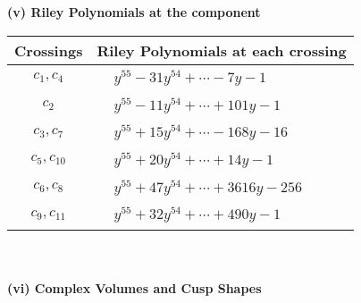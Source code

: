 \documentclass[1p]{elsarticle_modified}
\theoremstyle{definition}
\begin{document}
\newpage\renewcommand{\arraystretch}{1}
\flushleft \textbf{(v) Riley Polynomials at the component}\newline \\
\begin{tabular}{m{50pt}|m{274pt}}
Crossings & \hspace{64pt}Riley Polynomials at each crossing \\
\hline $$\begin{aligned}c_{1},c_{4}\end{aligned}$$&$\begin{aligned}
&y^{55}-31 y^{54}+\cdots-7 y-1
\end{aligned}$\\
\hline $$\begin{aligned}c_{2}\end{aligned}$$&$\begin{aligned}
&y^{55}-11 y^{54}+\cdots+101 y-1
\end{aligned}$\\
\hline $$\begin{aligned}c_{3},c_{7}\end{aligned}$$&$\begin{aligned}
&y^{55}+15 y^{54}+\cdots-168 y-16
\end{aligned}$\\
\hline $$\begin{aligned}c_{5},c_{10}\end{aligned}$$&$\begin{aligned}
&y^{55}+20 y^{54}+\cdots+14 y-1
\end{aligned}$\\
\hline $$\begin{aligned}c_{6},c_{8}\end{aligned}$$&$\begin{aligned}
&y^{55}+47 y^{54}+\cdots+3616 y-256
\end{aligned}$\\
\hline $$\begin{aligned}c_{9},c_{11}\end{aligned}$$&$\begin{aligned}
&y^{55}+32 y^{54}+\cdots+490 y-1
\end{aligned}$\\
\hline
\end{tabular}\\~\\
\newpage\flushleft \textbf{(vi) Complex Volumes and Cusp Shapes}
\end{document}
